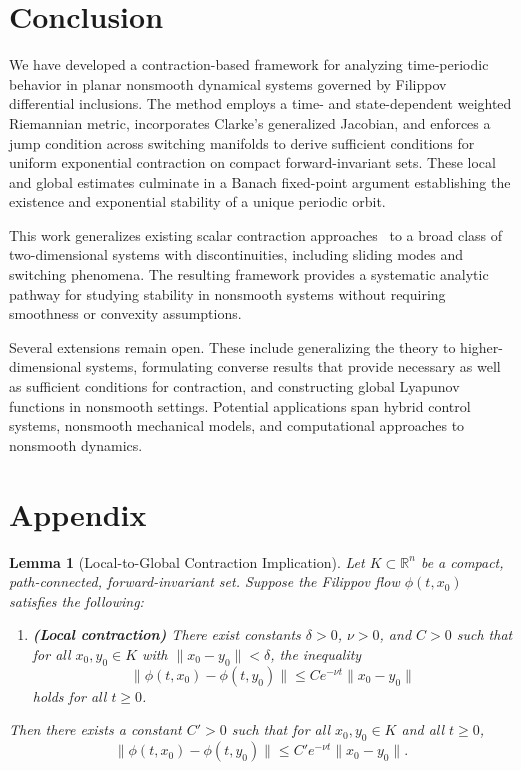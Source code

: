 \documentclass[11pt]{article}
\newtheorem{lemma}{Lemma}
\begin{document}
\section{Conclusion}
\label{sec:conclusion}

We have developed a contraction-based framework for analyzing time-periodic behavior in planar nonsmooth dynamical systems governed by Filippov differential inclusions. The method employs a time- and state-dependent weighted Riemannian metric, incorporates Clarke’s generalized Jacobian, and enforces a jump condition across switching manifolds to derive sufficient conditions for uniform exponential contraction on compact forward-invariant sets. These local and global estimates culminate in a Banach fixed-point argument establishing the existence and exponential stability of a unique periodic orbit.

This work generalizes existing scalar contraction approaches~\cite{giesl2005} to a broad class of two-dimensional systems with discontinuities, including sliding modes and switching phenomena. The resulting framework provides a systematic analytic pathway for studying stability in nonsmooth systems without requiring smoothness or convexity assumptions.

Several extensions remain open. These include generalizing the theory to higher-dimensional systems, formulating converse results that provide necessary as well as sufficient conditions for contraction, and constructing global Lyapunov functions in nonsmooth settings. Potential applications span hybrid control systems, nonsmooth mechanical models, and computational approaches to nonsmooth dynamics.




\section{Appendix}
\label{secx:appendix}


\begin{lemma}[Local-to-Global Contraction Implication]\label{lem:local_to_global_contraction}
	Let \( K \subset \mathbb{R}^n \) be a compact, path-connected, forward-invariant set. Suppose the Filippov flow \( \phi(t,x_0) \) satisfies the following:
	
	\begin{enumerate}
		\item[(i)] \textbf{(Local contraction)} There exist constants \( \delta > 0 \), \( \nu > 0 \), and \( C > 0 \) such that for all \( x_0, y_0 \in K \) with \( \|x_0 - y_0\| < \delta \), the inequality
		\[
		\|\phi(t, x_0) - \phi(t, y_0)\| \leq C e^{-\nu t} \|x_0 - y_0\|
		\]
		holds for all \( t \geq 0 \).
	\end{enumerate}
	
	Then there exists a constant \( C' > 0 \) such that for all \( x_0, y_0 \in K \) and all \( t \geq 0 \),
	\[
	\|\phi(t, x_0) - \phi(t, y_0)\| \leq C' e^{-\nu t} \|x_0 - y_0\|.
	\]
\end{lemma}
\end{document}
